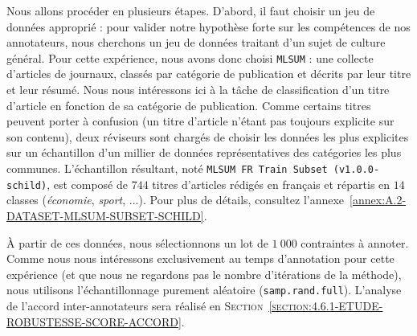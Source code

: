 			Nous allons procéder en plusieurs étapes.
			D'abord, il faut choisir un jeu de données approprié : pour valider notre hypothèse forte sur les compétences de nos annotateurs, nous cherchons un jeu de données traitant d'un sujet de culture général.
			Pour cette expérience, nous avons donc choisi \texttt{MLSUM} : une collecte d'articles de journaux, classés par catégorie de publication et décrits par leur titre et leur résumé.
			Nous nous intéressons ici à la tâche de classification d'un titre d'article en fonction de sa catégorie de publication.
			Comme certains titres peuvent porter à confusion (un titre d'article n'étant pas toujours explicite sur son contenu), deux réviseurs sont chargés de choisir les données les plus explicites sur un échantillon d'un millier de données représentatives des catégories les plus communes.
			L'échantillon résultant, noté \texttt{MLSUM FR Train Subset (v1.0.0-schild)}, est composé de $744$ titres d'articles rédigés en français et répartis en $14$ classes (\textit{économie}, \textit{sport}, ...).
			Pour plus de détails, consultez l'annexe~\ref{annex:A.2-DATASET-MLSUM-SUBSET-SCHILD}.
			
			À partir de ces données, nous sélectionnons un lot de $1~000$ contraintes à annoter.
			Comme nous nous intéressons exclusivement au temps d'annotation pour cette expérience (et que nous ne regardons pas le nombre d'itérations de la méthode), nous utilisons l'échantillonnage purement aléatoire (\texttt{samp.rand.full}).
			L'analyse de l'accord inter-annotateurs sera réalisé en \textsc{Section~\ref{section:4.6.1-ETUDE-ROBUSTESSE-SCORE-ACCORD}}.
			
